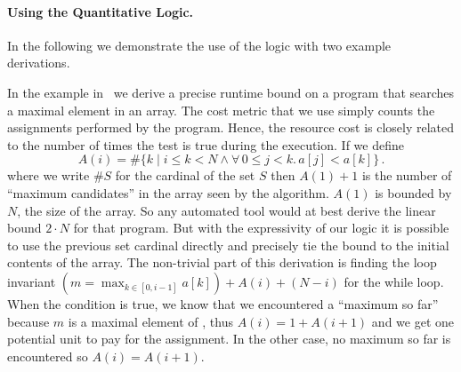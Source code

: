 \documentclass[nocopyrightspace,preprint]{sigplanconf}
\newcommand{\pref}[1]{\prettyref{#1}}
\begin{document}
\paragraph{Using the Quantitative Logic.}

In the following we demonstrate the use of the logic with two example
derivations.

In the example in~\pref{fig:xmplmax} we derive a precise runtime
bound on a program that searches a maximal element in an array.  The
cost metric that we use simply counts the assignments performed by the
program.  Hence, the resource cost is closely related to the
number of times the test  is true during the
execution.
%
If we define
$$
 A(i) =  \# \{ k \mid i \le k < N \land \forall\, 0 \le j < k.\, a[j] < a[k] \} \, .
$$
where we write $\# S$ for the cardinal of the set $S$ then $A(1)+1$ is
the number of ``maximum candidates'' in the array  seen
by the algorithm. $A(1)$ is bounded by $N$, the size of the array.
So any automated tool would at best derive the linear bound $2 \cdot
N$ for that program.  But with the expressivity of our logic it is
possible to use the previous set cardinal directly and precisely tie
the bound to the initial contents of the array.
%
The non-trivial part of this derivation is finding the loop invariant
$(m = \max_{k \in [0, i-1]} a[k]) + A(i) + (N-i)$ for the while loop.
When the condition  is true, we know that we
encountered a ``maximum so far'' because $m$ is a maximal element of
, thus $A(i) = 1 + A(i+1)$ and we get one
potential unit to pay for the assignment.  In the other case, no
maximum so far is encountered so $A(i) = A(i+1)$.
\end{document}

